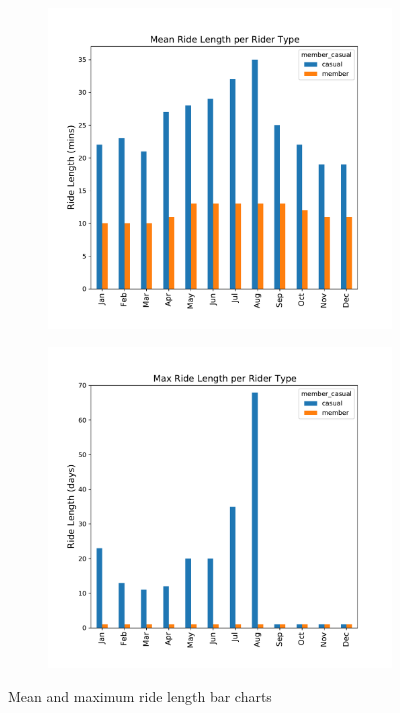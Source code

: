 \documentclass[12pt]{article}
\begin{document}
	\begin{figure}[h]
   		\begin{subfigure}{.45\textwidth}
		\includegraphics[scale=0.5]{mean_ridelength_bar.pdf} 
		\end{subfigure}
		\hspace{0.5in}
		\begin{subfigure}{.4\textwidth}
		\includegraphics[scale=0.5]{max_ridelength_bar.pdf} 
		\end{subfigure}
		\caption{Mean and maximum ride length bar charts}
	\end{figure}
\end{document}
